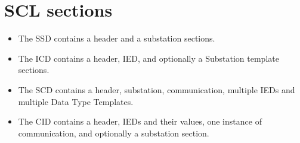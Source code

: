 \section{SCL sections}

\begin{itemize}
  \item The \gls{SSD} contains a header and a substation sections.
  \item The \gls{ICD} contains a header, IED, and optionally a Substation
  template sections.
  \item The \gls{SCD} contains a header, substation, communication, multiple
  IEDs and multiple Data Type Templates.
  \item The CID  contains a header, IEDs and
  their values, one instance of communication, and optionally a substation section. 
\end{itemize}
